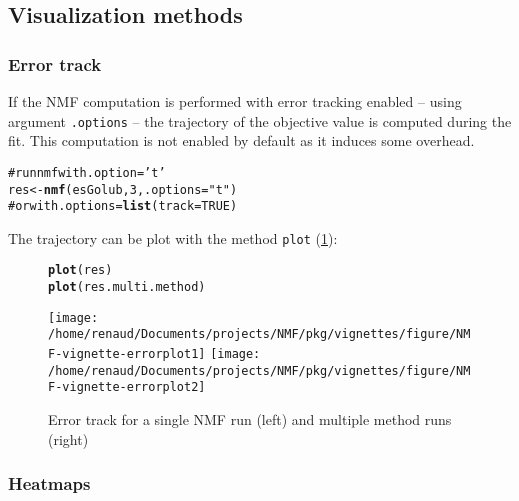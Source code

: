 \documentclass[a4paper]{article}\usepackage{graphicx, color}
\makeatletter
\newcommand{\hlfunctioncall}[1]{\textcolor[rgb]{0.501960784313725,0,0.329411764705882}{\textbf{#1}}}%
\newcommand{\hlstring}[1]{\textcolor[rgb]{0.6,0.6,1}{#1}}%
\newcommand{\hlcomment}[1]{\textcolor[rgb]{0.180392156862745,0.6,0.341176470588235}{#1}}%
\newenvironment{kframe}{%
 \def\at@end@of@kframe{}%
 \ifinner\ifhmode%
  \def\at@end@of@kframe{\end{minipage}}%
  \begin{minipage}{\columnwidth}%
 \fi\fi%
 \def\FrameCommand##1{\hskip\@totalleftmargin \hskip-\fboxsep
 \colorbox{shadecolor}{##1}\hskip-\fboxsep
     \hskip-\linewidth \hskip-\@totalleftmargin \hskip\columnwidth}%
 \MakeFramed {\advance\hsize-\width
   \@totalleftmargin\z@ \linewidth\hsize
   \@setminipage}}%
 {\par\unskip\endMakeFramed%
 \at@end@of@kframe}
\newenvironment{knitrout}{}{} %
\let\code=\texttt
\makeatother
\begin{document}
\subsection{Visualization methods}

\subsubsection*{Error track}

If the NMF computation is performed with error tracking enabled -- using argument \code{.options} -- the trajectory of the objective value is computed during the fit.
This computation is not enabled by default as it induces some overhead. 

\begin{knitrout}
\color{fgcolor}\begin{kframe}
\begin{alltt}
\hlcomment{# run nmf with .option=\hlstring{'t'}}
res <- \hlfunctioncall{nmf}(esGolub, 3, .options = \hlstring{"t"})
\hlcomment{# or with .options=\hlfunctioncall{list}(track=TRUE)}
\end{alltt}
\end{kframe}
\end{knitrout}


The trajectory can be plot with the method \code{plot} (\cref{fig:errorplot}):
\begin{figure}[!htbp]
\begin{knitrout}
\color{fgcolor}\begin{kframe}
\begin{alltt}
\hlfunctioncall{plot}(res)
\hlfunctioncall{plot}(res.multi.method)
\end{alltt}
\end{kframe}\texttt{[image: /home/renaud/Documents/projects/NMF/pkg/vignettes/figure/NMF-vignette-errorplot1]} \texttt{[image: /home/renaud/Documents/projects/NMF/pkg/vignettes/figure/NMF-vignette-errorplot2]} 
\end{knitrout}

\caption{Error track for a single NMF run (left) and multiple method
runs (right)}
\label{fig:errorplot}
\end{figure}

\subsubsection*{Heatmaps}
\end{document}
